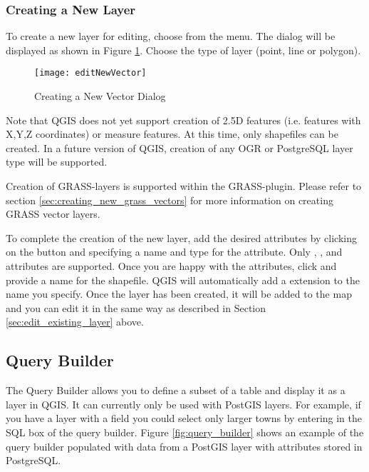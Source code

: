 \subsubsection{Creating a New Layer}\label{sec:create shape}

To create a new layer for editing, choose  from the
 menu. 
The  dialog will be displayed as
shown in Figure \ref{fig:newvectorlayer}. Choose the type of layer (point,
line or polygon).

\begin{figure}[ht]
   \begin{center}
   \caption{Creating a New Vector Dialog \nixcaption}\label{fig:newvectorlayer}\smallskip
   \texttt{[image: editNewVector]}
\end{center} 
\end{figure}

Note that QGIS does not yet support creation of 2.5D
features (i.e. features with X,Y,Z coordinates) or measure features. At this
time, only shapefiles can be created. In a future version of QGIS, creation of
any OGR or PostgreSQL layer type will be supported. 

Creation of GRASS-layers is supported within the GRASS-plugin. Please refer to section
\ref{sec:creating_new_grass_vectors} for more information on creating GRASS vector 
layers.

To complete the creation of the new layer, add the desired attributes by
clicking on the  button and specifying a name and type for the
attribute. Only , , and  attributes are supported. Once you
are happy with the attributes, click  and provide a name for the shapefile.
QGIS will automatically add a  extension to the name you specify.  Once
the layer has been created, it will be added to the map and you can edit it in
the same way as described in Section \ref{sec:edit_existing_layer} above. 

\subsection{Query Builder}\label{sec:query_builder}

The Query Builder allows you to define a subset of a table and display
it as a layer in QGIS. It can currently only be used with PostGIS layers. 
For example, if you have a  layer with a
 field you could select only larger towns by entering
 in the SQL box of the query builder. Figure
\ref{fig:query_builder} shows an example of the query builder populated with
data from a PostGIS layer with attributes stored in PostgreSQL. 

